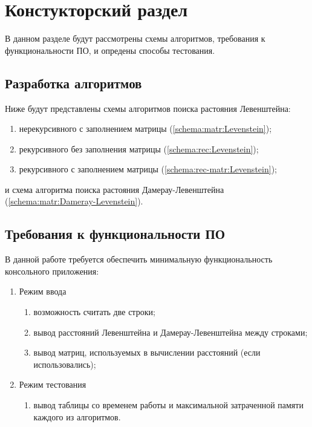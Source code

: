 \chapter{ Констукторский раздел}
\label{cha:design}
    В данном разделе будут рассмотрены схемы алгоритмов, требования к функциональности ПО,
    и опредены способы тестования.
    
    \section{Разработка алгоритмов}
        Ниже будут представлены схемы алгоритмов поиска растояния Левенштейна: \begin{enumerate}
            \item нерекурсивного с заполнением матрицы (\ref{schema:matr:Levenstein});
            \item рекурсивного без заполнения матрицы (\ref{schema:rec:Levenstein});
            \item рекурсивного с заполнением матрицы (\ref{schema:rec-matr:Levenstein});
        \end{enumerate}

        и схема алгоритма поиска растояния Дамерау-Левенштейна (\ref{schema:matr:Dameray-Levenstein}).

    \section{Требования к функциональности ПО}
        В данной работе требуется обеспечить минимальную функциональность консольного приложения:
        \begin{enumerate}
            \item Режим ввода
            \begin{enumerate}
                \item возможность считать две строки;
                \item вывод расстояний Левенштейна и Дамерау-Левенштейна между строками;
                \item вывод матриц, используемых в вычислении расстояний (если использовались);
            \end{enumerate}
            \item Режим тестования 
            \begin{enumerate}
                \item вывод таблицы со временем\cite{CPU-time} работы и максимальной затраченной памяти каждого из алгоритмов.
            \end{enumerate}
        \end{enumerate}
        

